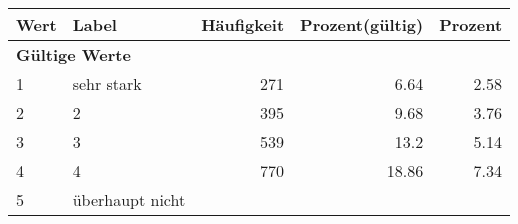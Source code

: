      \begin{longtable}{lXrrr}
     \toprule
     \textbf{Wert} & \textbf{Label} & \textbf{Häufigkeit} & \textbf{Prozent(gültig)} & \textbf{Prozent} \\
     \endhead
     \midrule
     \multicolumn{5}{l}{\textbf{Gültige Werte}}\\

     1 &
     \multicolumn{1}{X}{ sehr stark   } &


       \num{271} &
       \num[round-mode=places,round-precision=2]{6.64} &
         \num[round-mode=places,round-precision=2]{2.58} \\

     2 &
     \multicolumn{1}{X}{ 2   } &


       \num{395} &
       \num[round-mode=places,round-precision=2]{9.68} &
         \num[round-mode=places,round-precision=2]{3.76} \\

     3 &
     \multicolumn{1}{X}{ 3   } &


       \num{539} &
       \num[round-mode=places,round-precision=2]{13.2} &
         \num[round-mode=places,round-precision=2]{5.14} \\

     4 &
     \multicolumn{1}{X}{ 4   } &


       \num{770} &
       \num[round-mode=places,round-precision=2]{18.86} &
         \num[round-mode=places,round-precision=2]{7.34} \\

     5 &
     \multicolumn{1}{X}{ überhaupt nicht   } &



\end{longtable}
